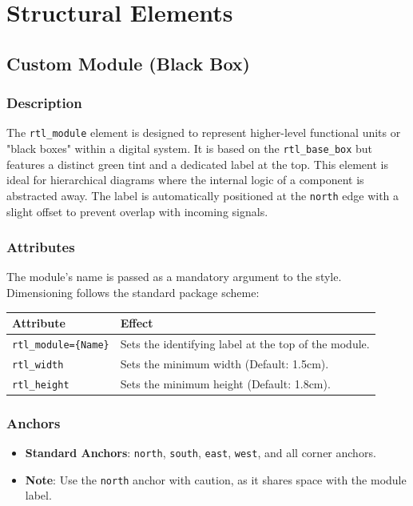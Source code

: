 \chapter{\sffamily  Structural Elements}

\section{\sffamily Custom Module (Black Box)}

    \subsection{\sffamily Description}
        The \texttt{rtl\_module} element is designed to represent higher-level functional units or "black boxes" within a digital system. It is based on the \texttt{rtl\_base\_box} but features a distinct green tint and a dedicated label at the top. 
        This element is ideal for hierarchical diagrams where the internal logic of a component is abstracted away. The label is automatically positioned at the \texttt{north} edge with a slight offset to prevent overlap with incoming signals.

    \subsection{\sffamily Attributes}
        The module's name is passed as a mandatory argument to the style. Dimensioning follows the standard package scheme:

    \begin{center}
        \begin{tabular}{lp{8cm}}
        \toprule
            \textbf{Attribute} & \textbf{Effect} \\
            \midrule
            \texttt{rtl\_module=\{Name\}} & Sets the identifying label at the top of the module. \\
            \texttt{rtl\_width} & Sets the minimum width (Default: 1.5cm). \\
            \texttt{rtl\_height} & Sets the minimum height (Default: 1.8cm). \\
            \bottomrule
        \end{tabular}
    \end{center}

    \subsection{\sffamily Anchors}
        \begin{itemize}
            \item \textbf{Standard Anchors}: \texttt{north}, \texttt{south}, \texttt{east}, \texttt{west}, and all corner anchors.
            \item \textbf{Note}: Use the \texttt{north} anchor with caution, as it shares space with the module label.
        \end{itemize}

